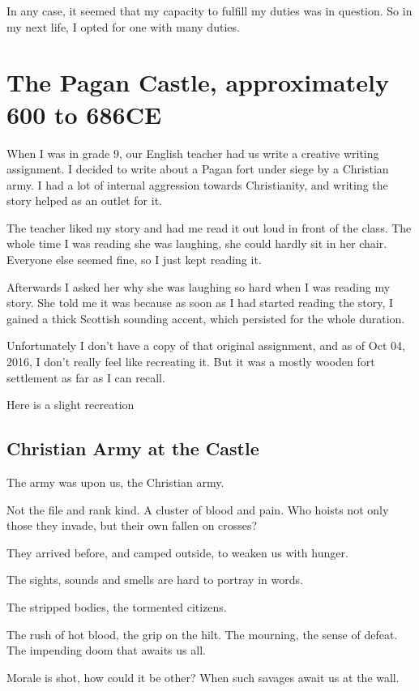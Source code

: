 In any case, it seemed that my capacity to fulfill my duties was in question. So
in my next life, I opted for one with many duties.

\chapter{The Pagan Castle, approximately 600 to 686CE}
\label{reincarnation:arwald}
When I was in grade 9, our English teacher had us write a creative writing
assignment. I decided to write about a Pagan fort under siege by a Christian
army.  I had a lot of internal aggression towards Christianity, and writing the
story helped as an outlet for it. 

The teacher liked my story and had me read it out loud in front of the class.
The whole time I was reading she was laughing, she could hardly sit in her
chair. Everyone else seemed fine, so I just kept reading it. 

Afterwards I asked her why she was laughing so hard when I was reading my story. 
She told me it was because as soon as I had started reading the story, I gained
a thick Scottish sounding accent, which persisted for the whole duration. 

Unfortunately I don't have a copy of that original assignment, and as of Oct
04, 2016, I don't really feel like recreating it. But it was a mostly wooden 
fort settlement as far as I can recall. 

Here is a slight recreation

\section{Christian Army at the Castle}
The army was upon us, the Christian army.

Not the file and rank kind. A cluster of blood and pain. 
Who hoists not only those they invade, but their own fallen on crosses?

They arrived before, and camped outside, to weaken us with hunger. 

The sights, sounds and smells are hard to portray in words. 

The stripped bodies, the tormented citizens. 

The rush of hot blood, the grip on the hilt. The mourning, the sense of defeat. 
The impending doom that awaits us all. 

Morale is shot, how could it be other? When such savages await us at the wall.

